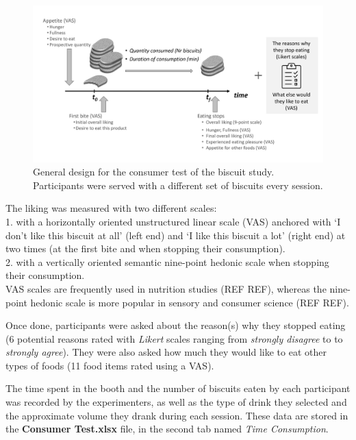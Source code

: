 \documentclass[
]{book}
\begin{document}
\begin{figure}

{\centering \includegraphics[width=42.47in]{images/consumer_test_design} 

}

\caption{General design for the consumer test of the biscuit study. Participants were served with a different set of biscuits every session.}\label{fig:test-design}
\end{figure}

The liking was measured with two different scales:\\
1. with a horizontally oriented unstructured linear scale (VAS) anchored with `I don't like this biscuit at all' (left end) and `I like this biscuit a lot' (right end) at two times (at the first bite and when stopping their consumption).\\
2. with a vertically oriented semantic nine-point hedonic scale when stopping their consumption.\\
VAS scales are frequently used in nutrition studies (REF REF), whereas the nine-point hedonic scale is more popular in sensory and consumer science (REF REF).

Once done, participants were asked about the reason(s) why they stopped eating (6 potential reasons rated with \emph{Likert} scales ranging from \emph{strongly disagree} to to \emph{strongly agree}). They were also asked how much they would like to eat other types of foods (11 food items rated using a VAS).

The time spent in the booth and the number of biscuits eaten by each participant was recorded by the experimenters, as well as the type of drink they selected and the approximate volume they drank during each session. These data are stored in the \textbf{Consumer Test.xlsx} file, in the second tab named \emph{Time Consumption}.
\end{document}
